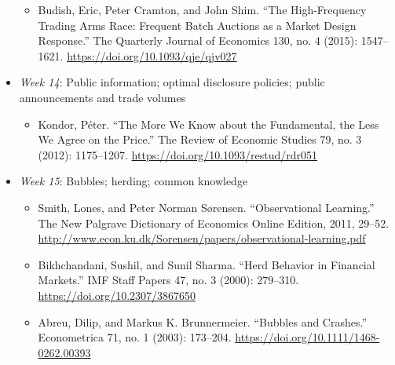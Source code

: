 \documentclass{article}
\begin{document}
\begin{itemize}
\begin{itemize}
		\item Budish, Eric, Peter Cramton, and John Shim. “The High-Frequency Trading Arms Race: Frequent Batch Auctions as a Market Design Response.” The Quarterly Journal of Economics 130, no. 4 (2015): 1547–1621. \url{https://doi.org/10.1093/qje/qjv027}
	\end{itemize}
	\item \textit{Week 14}: Public information; optimal disclosure policies; public announcements and trade volumes
	\begin{itemize}
		\item Kondor, Péter. “The More We Know about the Fundamental, the Less We Agree on the Price.” The Review of Economic Studies 79, no. 3 (2012): 1175–1207. \url{https://doi.org/10.1093/restud/rdr051}
	\end{itemize}
	\item \textit{Week 15}: Bubbles; herding; common knowledge
	\begin{itemize}
		\item Smith, Lones, and Peter Norman Sørensen. “Observational Learning.” The New Palgrave Dictionary of Economics Online Edition, 2011, 29–52. \url{http://www.econ.ku.dk/Sorensen/papers/observational-learning.pdf}
		\item Bikhchandani, Sushil, and Sunil Sharma. “Herd Behavior in Financial Markets.” IMF Staff Papers 47, no. 3 (2000): 279–310. \url{https://doi.org/10.2307/3867650}
		\item Abreu, Dilip, and Markus K. Brunnermeier. “Bubbles and Crashes.” Econometrica 71, no. 1 (2003): 173–204. \url{https://doi.org/10.1111/1468-0262.00393}
	\end{itemize}
\end{itemize}



\end{document}
